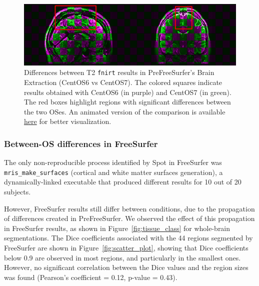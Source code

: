 \documentclass[a4paper,num-refs]{oup-contemporary}
\newcommand{\revised}[1]{\color{blue}#1\color{black}\xspace}
\newcommand{\toolname}[0]{Spot\xspace}
\newcommand{\fnirt}[0]{\texttt{fnirt}\xspace}
\begin{document}
\begin{figure}
  \centering
    \includegraphics[width=\columnwidth]{figures/t2w_alignment.png}
    \caption{Differences between T2 \fnirt results in PreFreeSurfer's Brain Extraction (CentOS6 vs CentOS7).
    \revised{
    The colored squares indicate results obtained with CentOS6 (in purple) and CentOS7 (in green).
    The red boxes highlight regions with significant differences between the two OSes. }
    An animated version of the comparison is available \href{https://github.com/big-data-lab-team/HCP-reproducibility-paper/blob/master/figures/pfs_t2w_alignment.gif}{here} for better visualization.}
    \label{fig:fnirt_result}
\end{figure}

\subsubsection{Between-OS differences in FreeSurfer}

The only non-reproducible process identified by \toolname in FreeSurfer was
\texttt{mris\_make\_surfaces} (cortical and white matter surfaces
generation), a dynamically-linked executable
that produced different results for
10 out of 20 subjects.

However, FreeSurfer results still differ between conditions, due to the
propagation of differences created in PreFreeSurfer. We
observed the effect of this propagation in FreeSurfer results, as shown in
Figure~\ref{fig:tissue_class} for whole-brain segmentations. The
Dice coefficients associated with the 44 regions segmented by
FreeSurfer are shown in Figure~\ref{fig:scatter_plot}, showing that Dice coefficients below 0.9 are
observed in most regions, and particularly in the smallest ones.
\revised{However, no significant correlation between the Dice values and the region sizes was found
(Pearson's coefficient = 0.12, p-value = 0.43).}
\end{document}
